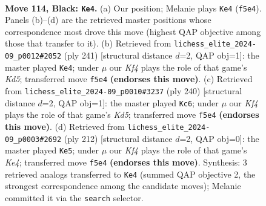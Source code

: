 \documentclass[11pt]{article}
\begin{document}
\clearpage

\begin{figure}[p]\centering
\begin{subfigure}{0.46\textwidth}\centering
\resizebox{\linewidth}{!}{%
\newchessgame
\chessboard[
  setfen={7r/8/8/5k2/8/1r6/6K1/8 b - - 3 114},
  showmover=false,
  pgfstyle=straightmove, color=movearrow, markmove={f5-e4}
]}
\caption{}
\end{subfigure}\hfill
\begin{subfigure}{0.46\textwidth}\centering
\resizebox{\linewidth}{!}{%
\newchessgame
\chessboard[
  setfen={8/R7/8/6r1/3k4/8/5K2/8 b - - 19 121},
  showmover=false,
  pgfstyle=straightmove, color=movearrow, markmove={d4-e4}
]}
\caption{}
\end{subfigure}
\\[4pt]
\begin{subfigure}{0.46\textwidth}\centering
\resizebox{\linewidth}{!}{%
\newchessgame
\chessboard[
  setfen={8/8/8/3K4/1k6/8/6r1/R7 w - - 64 121},
  showmover=false,
  pgfstyle=straightmove, color=movearrow, markmove={d5-c6}
]}
\caption{}
\end{subfigure}\hfill
\begin{subfigure}{0.46\textwidth}\centering
\resizebox{\linewidth}{!}{%
\newchessgame
\chessboard[
  setfen={7k/2r5/8/8/4K3/6R1/8/8 w - - 9 107},
  showmover=false,
  pgfstyle=straightmove, color=movearrow, markmove={e4-e5}
]}
\caption{}
\end{subfigure}
\caption{\textbf{Move 114, Black: \texttt{Ke4}.} (a) Our position; Melanie plays \texttt{Ke4} (\texttt{f5e4}). Panels (b)--(d) are the retrieved master positions whose correspondence most drove this move (highest QAP objective among those that transfer to it). (b) Retrieved from \texttt{lichess\_elite\_2024-09\_p0012\#2052} (ply 241) [structural distance $d$=2, QAP obj=1]: the master played \texttt{Ke4}; under $\mu$ our \emph{Kf4} plays the role of that game's \emph{Kd5}; transferred move \texttt{f5e4} \textbf{(endorses this move)}. (c) Retrieved from \texttt{lichess\_elite\_2024-09\_p0010\#3237} (ply 240) [structural distance $d$=2, QAP obj=1]: the master played \texttt{Kc6}; under $\mu$ our \emph{Kf4} plays the role of that game's \emph{Kd5}; transferred move \texttt{f5e4} \textbf{(endorses this move)}. (d) Retrieved from \texttt{lichess\_elite\_2024-09\_p0003\#2692} (ply 212) [structural distance $d$=2, QAP obj=0]: the master played \texttt{Ke5}; under $\mu$ our \emph{Kf4} plays the role of that game's \emph{Ke4}; transferred move \texttt{f5e4} \textbf{(endorses this move)}. Synthesis: 3 retrieved analogs transferred to \texttt{Ke4} (summed QAP objective 2, the strongest correspondence among the candidate moves); Melanie committed it via the \texttt{search} selector.}
\label{fig:thought-m227}
\end{figure}
\end{document}

